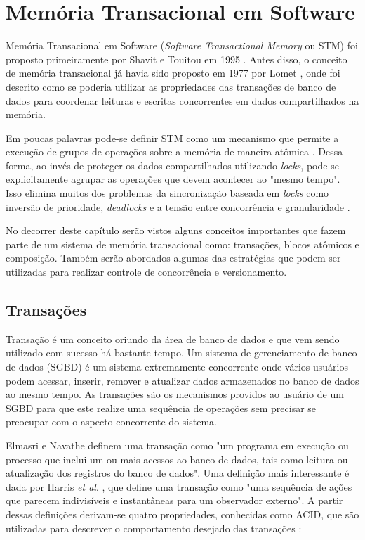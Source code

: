 \chapter{Memória Transacional em Software}

Memória Transacional em Software (\emph{Software Transactional Memory} ou STM) foi proposto primeiramente por Shavit e Touitou em 1995 \cite{shavit1995software}. Antes disso, o conceito de memória transacional já havia sido proposto em 1977 por Lomet \cite{lomet1977process}, onde foi descrito como se poderia utilizar as propriedades das transações de banco de dados para coordenar leituras e escritas concorrentes em dados compartilhados na memória.

Em poucas palavras pode-se definir STM como um mecanismo que permite a execução de grupos de operações sobre a memória de maneira atômica \cite{harris2005composable}. Dessa forma, ao invés de proteger os dados compartilhados utilizando \emph{locks}, pode-se explicitamente agrupar as operações que devem acontecer ao "mesmo tempo". Isso elimina muitos dos problemas da sincronização baseada em \emph{locks} como inversão de prioridade, \emph{deadlocks} e a tensão entre concorrência e granularidade \cite{harris2005composable}.

No decorrer deste capítulo serão vistos alguns conceitos importantes que fazem parte de um sistema de memória transacional como: transações, blocos atômicos e composição. Também serão abordados algumas das estratégias que podem ser utilizadas para realizar controle de concorrência e versionamento.

\section{Transações}

Transação é um conceito oriundo da área de banco de dados e que vem sendo utilizado com sucesso há bastante tempo. Um sistema de gerenciamento de banco de dados (SGBD) é um sistema extremamente concorrente onde vários usuários podem acessar, inserir, remover e atualizar dados armazenados no banco de dados ao mesmo tempo. As transações são os mecanismos providos ao usuário de um SGBD para que este realize uma sequência de operações sem precisar se preocupar com o aspecto concorrente do sistema.

Elmasri e Navathe \cite{elmasri06db} definem uma transação como "um programa em execução ou processo que inclui um ou mais acessos ao banco de dados, tais como leitura ou atualização dos registros do banco de dados". Uma definição mais interessante é dada por Harris \emph{et al}. \cite{harris2010transactional}, que define uma transação como "uma sequência de ações que parecem indivisíveis e instantâneas para um observador externo". A partir dessas definições derivam-se quatro propriedades, conhecidas como ACID, que são utilizadas para descrever o comportamento desejado das transações \cite{silberschatz1997database}:

